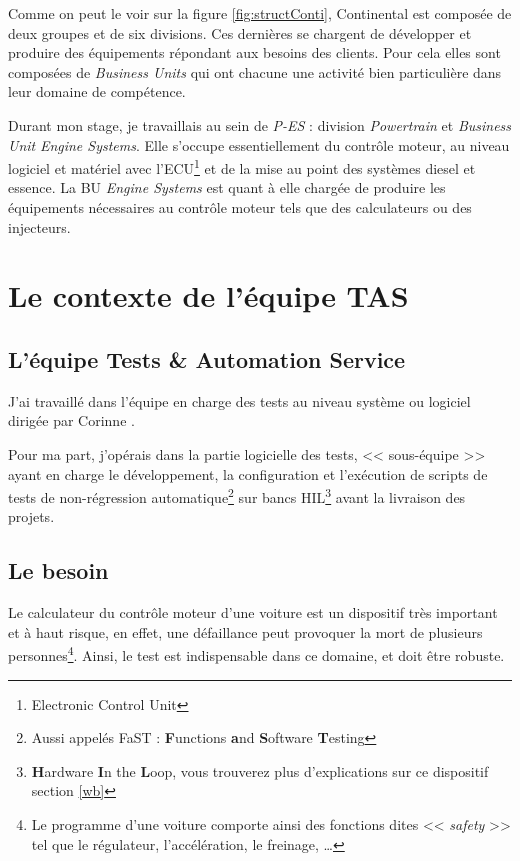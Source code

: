 		Comme on peut le voir sur la figure \ref{fig:structConti}, Continental est composée de deux groupes et de six divisions. Ces dernières se chargent de développer et produire des équipements répondant aux besoins des clients. Pour cela elles sont composées de \textit{Business Units} qui ont chacune une activité bien particulière dans leur domaine de compétence. 

Durant mon stage, je travaillais au sein de \textit{P-ES} : division \textit{Powertrain} et \textit{Business Unit} \textit{Engine Systems}. Elle s'occupe essentiellement du contrôle moteur, au niveau logiciel et matériel avec l'ECU\footnote{Electronic Control Unit} et de la mise au point des systèmes diesel et essence. La BU \textit{Engine Systems} est quant à elle chargée de produire les équipements nécessaires au contrôle moteur tels que des calculateurs ou des injecteurs.

	\section{Le contexte de l'équipe TAS}
 		\subsection{L'équipe Tests \& Automation Service}
 		J'ai travaillé dans l'équipe en charge des tests au niveau système ou logiciel dirigée par Corinne . 
 		
 		Pour ma part, j'opérais dans la partie logicielle des tests, << sous-équipe >> ayant en charge le développement, la configuration et l'exécution de scripts de tests de non-régression automatique\footnote{Aussi appelés FaST : \textbf{F}unctions \textbf{a}nd \textbf{S}oftware \textbf{T}esting} sur bancs HIL\footnote{\textbf{H}ardware \textbf{I}n the \textbf{L}oop, vous trouverez plus d'explications sur ce dispositif section \ref{wb}} avant la livraison des projets.
		
 		\subsection{Le besoin} \label{besoinTests}
 		Le calculateur du contrôle moteur d'une voiture est un dispositif très important et à haut risque, en effet, une défaillance peut provoquer la mort de plusieurs personnes\footnote{Le programme d'une voiture comporte ainsi des fonctions dites << \textit{safety} >> tel que le régulateur, l'accélération, le freinage, \ldots}. Ainsi, le test est indispensable dans ce domaine, et doit être robuste. 


